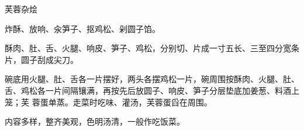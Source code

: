 %
%
%
%
%
%
%
\begin{recipe}{芙蓉杂烩}

\ingredients


\preparation

\step 炸酥、放响、汆笋子、抠鸡松、剁圆子馅。

\step 酥肉、肚、舌、火腿、响皮、笋子、鸡松，分别切、片成一寸五长、三至四分宽条
片，圆子刮成尖刀。

\step 碗底用火腿、肚、舌各一片摆好，两头各摆鸡松一片，碗周围按酥肉、火腿、肚、
舌、鸡松各一片间隔镶满，再按先后放圆子、响皮、笋子分层垫底加姜葱、料酒上笼；芙
蓉蛋单蒸。走菜时吃味、灌汤，芙蓉蛋舀在周围。

\features

内容多样，整齐美观，色明汤清，一般作吃饭菜。

\end{recipe}

